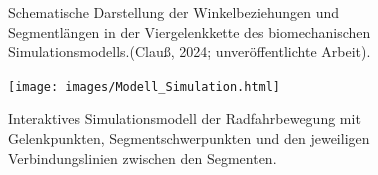 \documentclass[
  letterpaper,
  DIV=11]{scrartcl}
\begin{document}
\begin{figure}


\caption{\label{fig-Viergelenkkette}Schematische Darstellung der
Winkelbeziehungen und Segmentlängen in der Viergelenkkette des
biomechanischen Simulationsmodells.(Clauß, 2024; unveröffentlichte
Arbeit).}

\end{figure}%

\begin{figure}

\texttt{[image: images/Modell\_Simulation.html]}

\caption{\label{fig-Kinematik_Simulationsmodell}Interaktives
Simulationsmodell der Radfahrbewegung mit Gelenkpunkten,
Segmentschwerpunkten und den jeweiligen Verbindungslinien zwischen den
Segmenten.}

\end{figure}%
\end{document}
